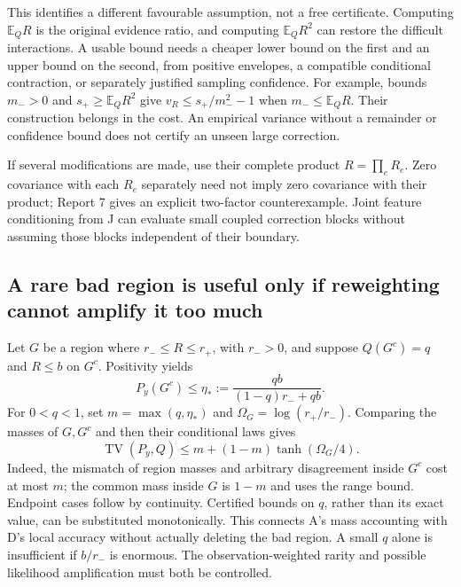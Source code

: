 \documentclass[10pt,a4paper]{article}
\newcommand{\E}{\mathbb E}
\newcommand{\TV}{\operatorname{TV}}
\begin{document}
This identifies a different favourable assumption, not a free certificate. Computing $\E_QR$ is the
original evidence ratio, and computing $\E_QR^2$ can restore the difficult interactions. A usable bound needs
a cheaper lower bound on the first and an upper bound on the second, from positive envelopes, a compatible
conditional contraction, or separately justified sampling confidence. For example, bounds $m_->0$ and
$s_+\geq\E_QR^2$ give $v_R\leq s_+/m_-^2-1$ when $m_-\leq\E_QR$.
Their construction belongs in the cost. An empirical variance without a remainder or confidence bound
does not certify an unseen large correction.

If several modifications are made, use their complete product $R=\prod_e R_e$.
Zero covariance with each $R_e$ separately need not imply zero covariance with their product; Report 7
gives an explicit two-factor counterexample. Joint feature conditioning from J can evaluate small coupled
correction blocks without assuming those blocks independent of their boundary.

\subsection{A rare bad region is useful only if reweighting cannot amplify it too much}
Let $G$ be a region where $r_-\leq R\leq r_+$, with $r_->0$, and suppose
$Q(G^c)=q$ and $R\leq b$ on $G^c$. Positivity yields
\[
 P_y(G^c)\leq\eta_*:=\frac{qb}{(1-q)r_-+qb}.
\]
For $0<q<1$, set $m=\max(q,\eta_*)$ and $\Omega_G=\log(r_+/r_-)$. Comparing the masses of $G,G^c$
and then their conditional laws gives
\begin{equation}
 \TV(P_y,Q)\leq m+(1-m)\tanh(\Omega_G/4).
 \label{eq:good-region-correction}
\end{equation}
Indeed, the mismatch of region masses and arbitrary disagreement inside $G^c$ cost at most $m$;
the common mass inside $G$ is $1-m$ and uses the range bound. Endpoint cases follow by continuity.
Certified bounds on $q$, rather than its exact value, can be substituted monotonically.
This connects A's mass accounting with D's local accuracy without actually deleting the bad region.
A small $q$ alone is insufficient if $b/r_-$ is enormous. The observation-weighted rarity and possible
likelihood amplification must both be controlled.
\end{document}
